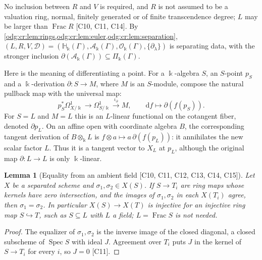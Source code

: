\documentclass[11pt,oneside]{article}
\numberwithin{equation}{section}
\newtheorem{lemma}[lemma]{Lemma}
\theoremstyle{definition}
\theoremstyle{remark}
\newcommand{\Frac}{\operatorname{Frac}}
\newcommand{\src}[1]{\textup{\textsf{\small[#1]}}}
\newcommand{\crH}{\mathbb H_\Bbbk(\Gamma)}
\newcommand{\crA}{\mathcal A_\Bbbk(\Gamma)}
\newcommand{\crP}{\Pi_\Bbbk(\Gamma)}
\newcommand{\crO}{\mathcal O_\Bbbk(\Gamma)}
\newcommand{\Spec}{\operatorname{Spec}}
\newcommand{\dif}{\mathrm d}
\begin{document}
No inclusion between $R$ and $V$ is required, and $R$ is not assumed to be a
valuation ring, normal, finitely generated or of finite transcendence degree;
$L$ may be larger than $\Frac R$ \src{C10, C11, C14}. By
\cref{odg:cr:lem:rings,odg:cr:lem:euler,odg:cr:lem:separation},
$(L,R,V,\mathcal D)=(\crH,\crA,\crO,\{\partial_\lambda\})$ is separating data, with
the stronger inclusion $\partial(\crA)\subseteq\crP$.

Here is the meaning of differentiating a point. For a $\Bbbk$-algebra $S$,
an $S$-point $p_S$ and a $\Bbbk$-derivation $\partial:S\to M$, where $M$ is
an $S$-module, compose the natural pullback map with the universal map:
\[
 p_S^*\Omega^1_{X/\Bbbk}\longrightarrow\Omega^1_{S/\Bbbk}
 \xrightarrow{\ \iota_\partial\ }M,
 \qquad \dif f\longmapsto\partial(f(p_S)).
\]
For $S=L$ and $M=L$ this is an $L$-linear functional on the cotangent
fiber, denoted $\partial p_L$. On an affine open with coordinate algebra
$B$, the corresponding tangent derivation of $B\otimes_\Bbbk L$ is
$f\otimes a\mapsto a\,\partial(f(p_L))$: it annihilates the new scalar factor
$L$. Thus it is a tangent vector to $X_L$ at $p_L$, although the original
map $\partial:L\to L$ is only $\Bbbk$-linear.

\begin{lemma}[Equality from an ambient field \src{C10, C11, C12, C13, C14, C15}]\label{odg:cr:lem:separated}
Let $X$ be a separated scheme and $\sigma_1,\sigma_2\in X(S)$. If $S\to T_i$ are
ring maps whose kernels have zero intersection, and the images of
$\sigma_1,\sigma_2$ in each $X(T_i)$ agree, then $\sigma_1=\sigma_2$. In particular
$X(S)\to X(T)$ is injective for an injective ring map $S\hookrightarrow T$, such as
$S\subseteq L$ with $L$ a field; $L=\Frac S$ is not needed.
\end{lemma}
\begin{proof}
The equalizer of $\sigma_1,\sigma_2$ is the inverse image of the closed diagonal,
a closed subscheme of $\Spec S$ with ideal $J$. Agreement over $T_i$ puts $J$ in
the kernel of $S\to T_i$ for every $i$, so $J=0$ \src{C11}.
\end{proof}
\end{document}

